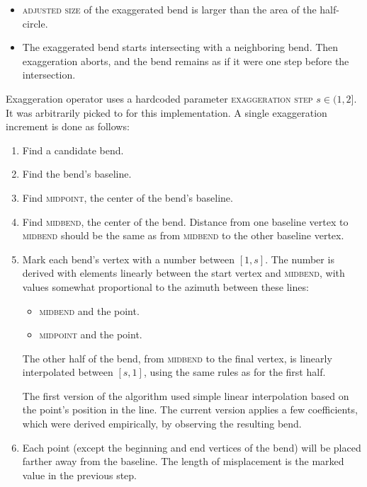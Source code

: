 \documentclass[a4paper]{article}
\begin{document}
\begin{itemize}
    \item \textsc{adjusted size} of the exaggerated bend is larger than the area of
        the half-circle.

    \item The exaggerated bend starts intersecting with a neighboring bend.
        Then exaggeration aborts, and the bend remains as if it were one step
        before the intersection.

\end{itemize}

Exaggeration operator uses a hardcoded parameter \textsc{exaggeration step} $s
\in (1,2]$. It was arbitrarily picked to {\exaggerationEnthusiasm} for this
implementation. A single exaggeration increment is done as follows:

\begin{enumerate}
    \item Find a candidate bend.
    \item Find the bend's baseline.
    \item Find \textsc{midpoint}, the center of the bend's baseline.

    \item Find \textsc{midbend}, the center of the bend. Distance from one
        baseline vertex to \textsc{midbend} should be the same as from
        \textsc{midbend} to the other baseline vertex.

    \item Mark each bend's vertex with a number between $[1,s]$. The number is
        derived with elements linearly between the start vertex and
        \textsc{midbend}, with values somewhat proportional to the azimuth
        between these lines:

        \begin{itemize}
            \item \textsc{midbend} and the point.
            \item \textsc{midpoint} and the point.
        \end{itemize}

        The other half of the bend, from \textsc{midbend} to the final vertex,
        is linearly interpolated between $[s,1]$, using the same rules as for
        the first half.

        The first version of the algorithm used simple linear interpolation
        based on the point's position in the line. The current version applies
        a few coefficients, which were derived empirically, by observing the
        resulting bend.

    \item Each point (except the beginning and end vertices of the bend) will
        be placed farther away from the baseline. The length of misplacement is
        the marked value in the previous step.

\end{enumerate}
\end{document}
